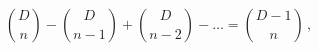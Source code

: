 \begin{equation}
  {D\choose n} - {D \choose n-1} + {D \choose n-2} - \ldots = {D-1\choose
  n}\,,
 \label{compnform}
\end{equation}

